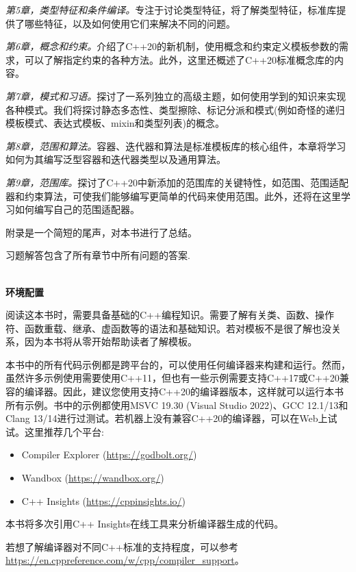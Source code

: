 \textit{第5章，类型特征和条件编译。}专注于讨论类型特征，将了解类型特征，标准库提供了哪些特征，以及如何使用它们来解决不同的问题。

\textit{第6章，概念和约束。}介绍了C++20的新机制，使用概念和约束定义模板参数的需求，可以了解指定约束的各种方法。此外，这里还概述了C++20标准概念库的内容。

\textit{第7章，模式和习语。}探讨了一系列独立的高级主题，如何使用学到的知识来实现各种模式。我们将探讨静态多态性、类型擦除、标记分派和模式(例如奇怪的递归模板模式、表达式模板、mixin和类型列表)的概念。

\textit{第8章，范围和算法。}容器、迭代器和算法是标准模板库的核心组件，本章将学习如何为其编写泛型容器和迭代器类型以及通用算法。

\textit{第9章，范围库。}探讨了C++20中新添加的范围库的关键特性，如范围、范围适配器和约束算法，可使我们能够编写更简单的代码来使用范围。此外，还将在这里学习如何编写自己的范围适配器。

附录是一个简短的尾声，对本书进行了总结。

习题解答包含了所有章节中所有问题的答案.

\hspace*{\fill} \\ %
\noindent
\textbf{环境配置}

阅读这本书时，需要具备基础的C++编程知识。需要了解有关类、函数、操作符、函数重载、继承、虚函数等的语法和基础知识。若对模板不是很了解也没关系，因为本书将从零开始帮助读者了解模板。

本书中的所有代码示例都是跨平台的，可以使用任何编译器来构建和运行。然而，虽然许多示例使用需要使用C++11，但也有一些示例需要支持C++17或C++20兼容的编译器。因此，建议您使用支持C++20的编译器版本，这样就可以运行本书所有示例。书中的示例都使用MSVC 19.30 (Visual Studio 2022)、GCC 12.1/13和Clang 13/14进行过测试。若机器上没有兼容C++20的编译器，可以在Web上试试。这里推荐几个平台:

\begin{itemize}
\item
Compiler Explorer (\url{https://godbolt.org/})

\item
Wandbox (\url{https://wandbox.org/})

\item
C++ Insights (\url{https://cppinsights.io/})
\end{itemize}

本书将多次引用C++ Insights在线工具来分析编译器生成的代码。

若想了解编译器对不同C++标准的支持程度，可以参考\url{https://en.cppreference.com/w/cpp/compiler\_support}。

